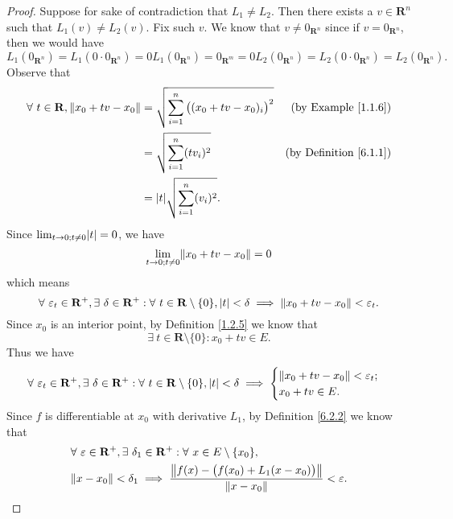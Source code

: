 \begin{proof}
    Suppose for sake of contradiction that \(L_1 \neq L_2\).
    Then there exists a \(v \in \mathbf{R}^n\) such that \(L_1(v) \neq L_2(v)\).
    Fix such \(v\).
    We know that \(v \neq 0_{\mathbf{R}^n}\) since if \(v = 0_{\mathbf{R}^n}\), then we would have
    \[
        L_1(0_{\mathbf{R}^n}) = L_1(0 \cdot 0_{\mathbf{R}^n}) = 0 L_1(0_{\mathbf{R}^n}) = 0_{\mathbf{R}^m} = 0 L_2(0_{\mathbf{R}^n}) = L_2(0 \cdot 0_{\mathbf{R}^n}) = L_2(0_{\mathbf{R}^n}).
    \]
    Observe that
    \begin{align*}
        \forall\ t \in \mathbf{R}, \norm*{x_0 + tv - x_0} & = \sqrt{\sum_{i = 1}^n \big((x_0 + tv - x_0)_i\big)^2} & \text{(by Example \ref{1.1.6})}    \\
                                                          & = \sqrt{\sum_{i = 1}^n (t v_i)^2}                      & \text{(by Definition \ref{6.1.1})} \\
                                                          & = \abs*{t} \sqrt{\sum_{i = 1}^n (v_i)^2}.
    \end{align*}
    Since \(\lim_{t \to 0 ; t \neq 0} \abs*{t} = 0\), we have
    \[
        \lim_{t \to 0 ; t \neq 0} \norm*{x_0 + tv - x_0} = 0
    \]
    which means
    \[
        \forall\ \varepsilon_t \in \mathbf{R}^+, \exists\ \delta \in \mathbf{R}^+ : \forall\ t \in \mathbf{R} \setminus \{0\}, \abs*{t} < \delta \implies \norm*{x_0 + tv - x_0} < \varepsilon_t.
    \]
    Since \(x_0\) is an interior point, by Definition \ref{1.2.5} we know that
    \[
        \exists\ t \in \mathbf{R} \setminus \{0\} : x_0 + tv \in E.
    \]
    Thus we have
    \[
        \forall\ \varepsilon_t \in \mathbf{R}^+, \exists\ \delta \in \mathbf{R}^+ : \forall\ t \in \mathbf{R} \setminus \{0\}, \abs*{t} < \delta \implies \begin{cases}
            \norm*{x_0 + tv - x_0} < \varepsilon_t; \\
            x_0 + tv \in E.
        \end{cases}
    \]
    Since \(f\) is differentiable at \(x_0\) with derivative \(L_1\), by Definition \ref{6.2.2} we know that
    \begin{align*}
         & \forall\ \varepsilon \in \mathbf{R}^+, \exists\ \delta_1 \in \mathbf{R}^+ : \forall\ x \in E \setminus \{x_0\},           \\
         & \norm*{x - x_0} < \delta_1 \implies \frac{\norm*{f(x) - \big(f(x_0) + L_1(x - x_0)\big)}}{\norm*{x - x_0}} < \varepsilon.
    \end{align*}

\end{proof}
